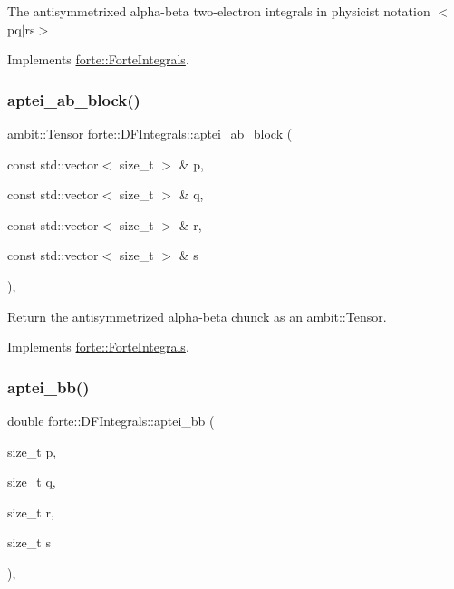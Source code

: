The antisymmetrixed alpha-\/beta two-\/electron integrals in physicist notation $<$pq$\vert$rs$>$ 



Implements \mbox{\hyperlink{classforte_1_1_forte_integrals_a45efc2329cdfc7e4690cbe85688b947e}{forte\+::\+Forte\+Integrals}}.

\mbox{\label{classforte_1_1_d_f_integrals_a0c7391787d43e90df9a343a59bcadfbc}} 
\subsubsection{\texorpdfstring{aptei\+\_\+ab\+\_\+block()}{aptei\_ab\_block()}}
{\footnotesize\ttfamily ambit\+::\+Tensor forte\+::\+D\+F\+Integrals\+::aptei\+\_\+ab\+\_\+block (\begin{DoxyParamCaption}\item[{const std\+::vector$<$ size\+\_\+t $>$ \&}]{p,  }\item[{const std\+::vector$<$ size\+\_\+t $>$ \&}]{q,  }\item[{const std\+::vector$<$ size\+\_\+t $>$ \&}]{r,  }\item[{const std\+::vector$<$ size\+\_\+t $>$ \&}]{s }\end{DoxyParamCaption})\hspace{0.3cm}{\ttfamily [override]}, {\ttfamily [virtual]}}



Return the antisymmetrized alpha-\/beta chunck as an ambit\+::\+Tensor. 



Implements \mbox{\hyperlink{classforte_1_1_forte_integrals_acd40e350dc861baf8adf6a3b47c74023}{forte\+::\+Forte\+Integrals}}.

\mbox{\label{classforte_1_1_d_f_integrals_ac9c2cb326b43623cbb290f7d6e1738cb}} 
\subsubsection{\texorpdfstring{aptei\+\_\+bb()}{aptei\_bb()}}
{\footnotesize\ttfamily double forte\+::\+D\+F\+Integrals\+::aptei\+\_\+bb (\begin{DoxyParamCaption}\item[{size\+\_\+t}]{p,  }\item[{size\+\_\+t}]{q,  }\item[{size\+\_\+t}]{r,  }\item[{size\+\_\+t}]{s }\end{DoxyParamCaption})\hspace{0.3cm}{\ttfamily [override]}, {\ttfamily [virtual]}}



